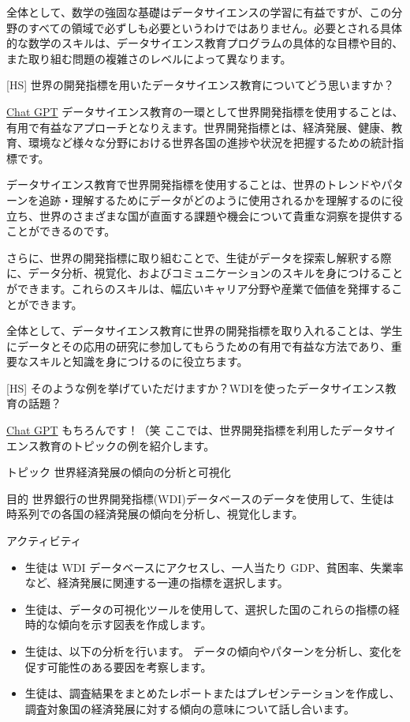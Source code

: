 \documentclass[
]{book}
\providecommand{\tightlist}{%
  \setlength{\itemsep}{0pt}\setlength{\parskip}{0pt}}
\theoremstyle{definition}
\theoremstyle{definition}
\theoremstyle{definition}
\theoremstyle{definition}
\theoremstyle{remark}
\begin{document}
全体として、数学の強固な基礎はデータサイエンスの学習に有益ですが、この分野のすべての領域で必ずしも必要というわけではありません。必要とされる具体的な数学のスキルは、データサイエンス教育プログラムの具体的な目標や目的、また取り組む問題の複雑さのレベルによって異なります。

{[}HS{]} 世界の開発指標を用いたデータサイエンス教育についてどう思いますか？

\protect\hyperlink{chatgpt}{Chat GPT} データサイエンス教育の一環として世界開発指標を使用することは、有用で有益なアプローチとなりえます。世界開発指標とは、経済発展、健康、教育、環境など様々な分野における世界各国の進捗や状況を把握するための統計指標です。

データサイエンス教育で世界開発指標を使用することは、世界のトレンドやパターンを追跡・理解するためにデータがどのように使用されるかを理解するのに役立ち、世界のさまざまな国が直面する課題や機会について貴重な洞察を提供することができるのです。

さらに、世界の開発指標に取り組むことで、生徒がデータを探索し解釈する際に、データ分析、視覚化、およびコミュニケーションのスキルを身につけることができます。これらのスキルは、幅広いキャリア分野や産業で価値を発揮することができます。

全体として、データサイエンス教育に世界の開発指標を取り入れることは、学生にデータとその応用の研究に参加してもらうための有用で有益な方法であり、重要なスキルと知識を身につけるのに役立ちます。

{[}HS{]} そのような例を挙げていただけますか？WDIを使ったデータサイエンス教育の話題？

\protect\hyperlink{chatgpt}{Chat GPT} もちろんです！（笑 ここでは、世界開発指標を利用したデータサイエンス教育のトピックの例を紹介します。

トピック 世界経済発展の傾向の分析と可視化

目的 世界銀行の世界開発指標(WDI)データベースのデータを使用して、生徒は時系列での各国の経済発展の傾向を分析し、視覚化します。

アクティビティ

\begin{itemize}
\tightlist
\item
  生徒は WDI データベースにアクセスし、一人当たり GDP、貧困率、失業率など、経済発展に関連する一連の指標を選択します。
\item
  生徒は、データの可視化ツールを使用して、選択した国のこれらの指標の経時的な傾向を示す図表を作成します。
\item
  生徒は、以下の分析を行います。 データの傾向やパターンを分析し、変化を促す可能性のある要因を考察します。
\item
  生徒は、調査結果をまとめたレポートまたはプレゼンテーションを作成し、調査対象国の経済発展に対する傾向の意味について話し合います。
\end{itemize}
\end{document}
